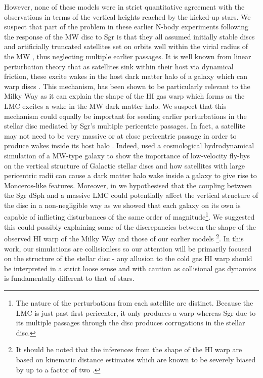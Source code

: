 \documentclass[useAMS,usenatbib]{mnras}
\begin{document}
However, none of these models were in strict quantitative agreement with the observations in terms of the vertical heights reached by the kicked-up stars. We suspect that part of the problem in these earlier N-body experiments following the response of the MW disc to Sgr is that they all assumed initially stable discs and artificially truncated satellites set on orbits well within the virial radius of the MW \citep{purcell11,gomez13,laporte16}, thus neglecting multiple earlier passages. It is well known from linear perturbation theory that as satellites sink within their host via dynamical friction, these excite wakes in the host dark matter halo of a galaxy which can warp discs \citep{weinberg89}. This mechanism, has been shown to be particularly relevant to the Milky Way as it can explain the shape of the HI gas warp \citep{weinberg06, laporte16} which forms as the LMC excites a wake in the MW dark matter halo. We suspect that this mechanism could equally be important for seeding earlier perturbations in the stellar disc mediated by Sgr's multiple pericentric passages. In fact, a satellite may not need to be very massive or at close pericentric passage in order to produce wakes inside its host halo \citep{vesperini00}. Indeed, \cite{gomez15b} used a cosmological hydrodynamical simulation of a MW-type galaxy to show the importance of low-velocity fly-bys on the vertical structure of Galactic stellar discs and how satellites with large pericentric radii can cause a dark matter halo wake inside a galaxy to give rise to Monceros-like features. Moreover, in \cite{laporte16} we hypothesised that the coupling between the Sgr dSph and a massive LMC could potentially affect the vertical structure of the disc in a non-negligible way as we showed that each galaxy on its own is capable of inflicting disturbances of the same order of magnitude\footnote{The nature of the perturbations from each satellite are distinct. Because the LMC is just past first pericenter, it only produces a warp whereas Sgr due to its multiple passages through the disc produces corrugations in the stellar disc.}. We suggested this could possibly explaining some of the discrepancies between the shape of the observed HI warp of the Milky Way and those of our earlier models \footnote{It should be noted that the inferences from the shape of the HI warp are based on kinematic distance estimates which are known to be severely biased by up to a factor of two \citep{reid14}.}. In this work, our simulations are collisionless so our attention will be primarily focused on the structure of the stellar disc - any allusion to the cold gas HI warp should be interpreted in a strict loose sense and with caution as collisional gas dynamics is fundamentally different to that of stars.
\end{document}
